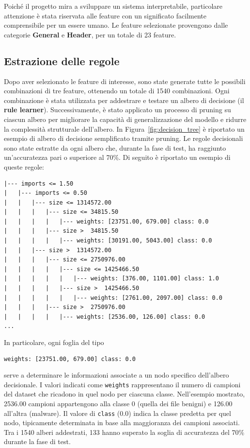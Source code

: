 \begin{multicols}{2}
Poiché il progetto mira a sviluppare un sistema interpretabile, particolare attenzione è stata riservata alle feature con un significato facilmente comprensibile per un essere umano. Le feature selezionate provengono dalle categorie \textbf{General} e \textbf{Header}, per un totale di 23 feature.

\subsection{Estrazione delle regole}
Dopo aver selezionato le feature di interesse, sono state generate tutte le possibili combinazioni di tre feature, ottenendo un totale di 1540 combinazioni. Ogni combinazione è stata utilizzata per addestrare e testare un albero di decisione (il \textbf{rule learner}). Successivamente, è stato applicato un processo di pruning su ciascun albero per migliorare la capacità di generalizzazione del modello e ridurre la complessità strutturale dell'albero. In Figura~\ref{fig:decision_tree} è riportato un esempio di albero di decisione semplificato tramite pruning. Le regole decisionali sono state estratte da ogni albero che, durante la fase di test, ha raggiunto un'accuratezza pari o superiore al 70\%. Di seguito è riportato un esempio di queste regole:
\begin{lstlisting}
|--- imports <= 1.50
|   |--- imports <= 0.50
|   |   |--- size <= 1314572.00
|   |   |   |--- size <= 34815.50
|   |   |   |   |--- weights: [23751.00, 679.00] class: 0.0
|   |   |   |--- size >  34815.50
|   |   |   |   |--- weights: [30191.00, 5043.00] class: 0.0
|   |   |--- size >  1314572.00
|   |   |   |--- size <= 2750976.00
|   |   |   |   |--- size <= 1425466.50
|   |   |   |   |   |--- weights: [376.00, 1101.00] class: 1.0
|   |   |   |   |--- size >  1425466.50
|   |   |   |   |   |--- weights: [2761.00, 2097.00] class: 0.0
|   |   |   |--- size >  2750976.00
|   |   |   |   |--- weights: [2536.00, 126.00] class: 0.0
...
\end{lstlisting}
In particolare, ogni foglia del tipo 
\smallskip
\begin{lstlisting}
weights: [23751.00, 679.00] class: 0.0
\end{lstlisting}
serve a determinare le informazioni associate a un nodo specifico dell'albero decisionale. I valori indicati come \texttt{weights} rappresentano il numero di campioni del dataset che ricadono in quel nodo per ciascuna classe. Nell'esempio mostrato, 2536.00 campioni appartengono alla classe 0 (quella dei file benigni) e 126.00 all'altra (malware). Il valore di \texttt{class} (0.0) indica la classe predetta per quel nodo, tipicamente determinata in base alla maggioranza dei campioni associati.
\newline\newline
Tra i 1540 alberi addestrati, 133 hanno superato la soglia di accuratezza del 70\% durante la fase di test.

\end{multicols}
